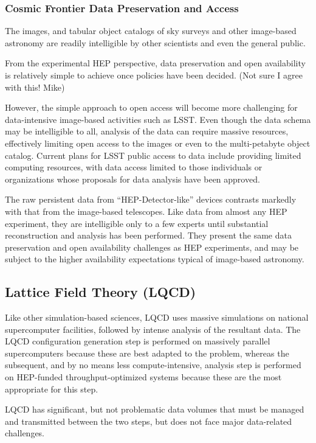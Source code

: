 \subsubsection{Cosmic Frontier Data Preservation and Access}

The images, and tabular object catalogs of sky surveys and other image-based astronomy 
are readily intelligible by other scientists and even the general public.  

From the 
experimental HEP perspective, data preservation and open availability is relatively 
simple to achieve once policies have been decided.  
(Not sure I agree with this!  Mike)

However, the simple approach to open access will become more challenging for data-intensive image-based activities such as LSST.  Even though the data schema may be intelligible to all, analysis of the data can require massive resources, effectively limiting open access to the images or even to the multi-petabyte object catalog.  Current plans for LSST public access to
data include providing limited computing resources, with data access limited to those individuals or organizations
whose proposals for data analysis have been approved.

The raw persistent data from ``HEP-Detector-like'' devices contrasts markedly with that from the 
image-based telescopes.  Like data from almost any HEP experiment, they are 
intelligible only to a few experts until substantial reconstruction and analysis 
has been performed.  They present the same data preservation and open availability 
challenges as HEP experiments, and may be subject to the higher availability 
expectations typical of image-based astronomy.

\subsection{Lattice Field Theory (LQCD)}
Like other simulation-based sciences, LQCD uses massive simulations on national 
supercomputer facilities, followed by intense analysis of the resultant data.  The LQCD configuration generation step is performed on massively parallel supercomputers 
because these are best adapted to the problem, whereas the subsequent, and by no means less compute-intensive, analysis step is performed on HEP-funded 
throughput-optimized systems because these are the most appropriate for this step.

LQCD has significant, but not problematic data volumes that must be managed and transmitted 
between the two steps, but does not face major data-related challenges.

